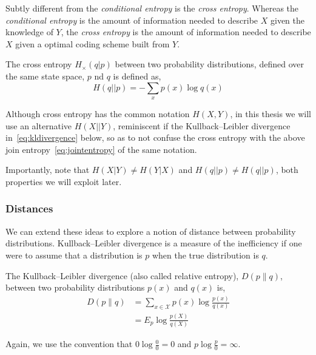 Subtly different from the \emph{conditional entropy} is the \emph{cross entropy}. Whereas the \emph{conditional entropy} is the amount of information needed to describe $X$ given the knowledge of $Y$, the \emph{cross entropy} is the amount of information needed to describe $X$ given a optimal coding scheme built from $Y$. 

\begin{definition}\label{def:crossentropy}
	The cross entropy $H_{\times} (q|p)$ between two probability distributions, defined over the same state space, $p$ nd $q$ is defined as, 
	\begin{equation}
	H (q||p)= - \sum_{x} p(x) \log {q(x)}
	\end{equation}
\end{definition}

Although cross entropy has the common notation $H(X, Y)$, in this thesis we will use an alternative $H(X||Y)$, reminiscent if the Kullback–Leibler divergence in~\autoref{eq:kldivergence} below, so as to not confuse the cross entropy with the above join entropy~\autoref{eq:jointentropy} of the same notation.



\begin{remark}
	Importantly, note that $H(X|Y) \neq  H(Y|X)$ and $H(q||p) \neq H (q||p)$, both properties we will exploit later.
\end{remark}


\subsubsection{Distances}
We can extend these ideas to explore a notion of distance between probability distributions. Kullback–Leibler divergence is a measure of the inefficiency if one were to assume that a distribution is $p$ when the true distribution is $q$.

\begin{definition}
	The Kullback–Leibler divergence (also called relative entropy), $D(p \|q)$,  between two probability distributions $p(x)$ and $q(x)$ is,
	\begin{align} \label{eq:kldivergence}
		D(p \| q) &=\sum_{x \in \mathcal{X}} p(x) \log \frac{p(x)}{q(x)} \\ 
					 &=E_{p} \log \frac{p(X)}{q(X)} 
	\end{align}
\end{definition}

Again, we use the convention that  $0 \log \frac{0}{0} = 0 $ and $p \log \frac{p}{0} = \infty $. 


